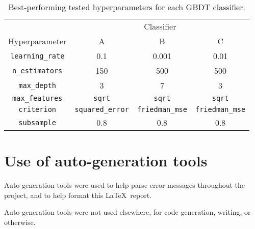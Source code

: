 \documentclass[11pt,a4paper]{article}
\begin{document}
\begin{table}[h]
    \centering
    \begin{tabular}{c|c|c|c}
    & \multicolumn{3}{|c}{Classifier} \\
    Hyperparameter & A & B & C \\
    \hline
    \texttt{learning\_rate} & 0.1 & 0.001 & 0.01 \\
    \texttt{n\_estimators} & 150 & 500 & 500 \\
    \texttt{max\_depth} & 3 & 7 & 3 \\
    \texttt{max\_features} & \texttt{sqrt} & \texttt{sqrt} & \texttt{sqrt} \\
    \texttt{criterion} & \texttt{squared\_error} & \texttt{friedman\_mse} & \texttt{friedman\_mse} \\
    \texttt{subsample} & 0.8 & 0.8 & 0.8 \\
    \end{tabular}
    \caption{Best-performing tested hyperparameters for each GBDT classifier.}
    \label{tab:hyperparameter}
\end{table}



\appendix
\section{Use of auto-generation tools}
Auto-generation tools were used to help parse error messages throughout the project, and to help format this \LaTeX\ report.

Auto-generation tools were not used elsewhere, for code generation, writing, or otherwise.
\end{document}
